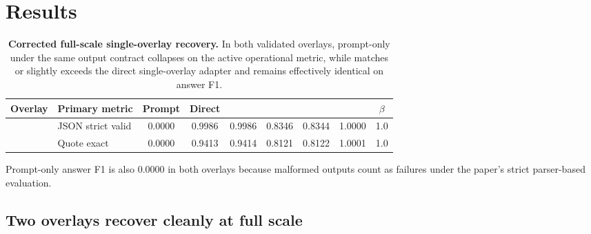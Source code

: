 
\section{Results}
\label{sec:results}

\begin{table}[t]
    \centering
    \begin{threeparttable}
    \caption{\textbf{Corrected full-scale single-overlay recovery.} In both validated overlays, prompt-only under the same output contract collapses on the active operational metric, while \method{} matches or slightly exceeds the direct single-overlay adapter and remains effectively identical on answer F1.}
    \label{tab:main-results}
    \small
    \setlength{\tabcolsep}{4pt}
    \renewcommand{\arraystretch}{1.06}
    \begin{tabular}{l l
                    S[table-format=1.4]
                    S[table-format=1.4]
                    S[table-format=1.4]
                    S[table-format=1.4]
                    S[table-format=1.4]
                    S[table-format=1.4]
                    S[table-format=1.4]}
        \toprule
        \textbf{Overlay} & \textbf{Primary metric} &
        {\textbf{Prompt}} &
        {\textbf{Direct}} &
        {\textbf{\method{}}} &
        {} &
        {} &
        {} &
        {\textbf{$\beta$}} \\
        \midrule
         & JSON strict valid & 0.0000 & 0.9986 & 0.9986 & 0.8346 & 0.8344 & 1.0000 & 1.0 \\
         & Quote exact & 0.0000 & 0.9413 & 0.9414 & 0.8121 & 0.8122 & 1.0001 & 1.0 \\
        \bottomrule
    \end{tabular}
    \begin{tablenotes}[flushleft]
        \footnotesize
        \item Prompt-only answer F1 is also \num{0.0000} in both overlays because malformed outputs count as failures under the paper's strict parser-based evaluation.
    \end{tablenotes}
    \end{threeparttable}
\end{table}

\subsection{Two overlays recover cleanly at full scale}

